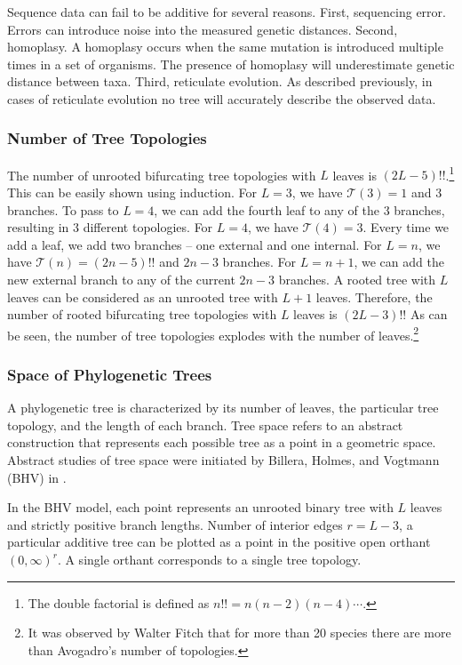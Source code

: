 Sequence data can fail to be additive for several reasons.
First, sequencing error.
Errors can introduce noise into the measured genetic distances.
Second, homoplasy.
A homoplasy occurs when the same mutation is introduced multiple times in a set of organisms.
The presence of homoplasy will underestimate genetic distance between taxa.
Third, reticulate evolution.
As described previously, in cases of reticulate evolution no tree will accurately describe the observed data.

\subsubsection{Number of Tree Topologies}

The number of unrooted bifurcating tree topologies with $L$ leaves is $(2L-5)!!$.\footnote{The double factorial is defined as $n!!=n(n-2)(n-4)\cdots$.}
This can be easily shown using induction.
For $L=3$, we have $\mathcal{T}(3)=1$ and $3$ branches.
To pass to $L=4$, we can add the fourth leaf to any of the $3$ branches, resulting in $3$ different topologies.
For $L=4$, we have $\mathcal{T}(4)=3$.
Every time we add a leaf, we add two branches -- one external and one internal.
For $L=n$, we have $\mathcal{T}(n)=(2n-5)!!$ and $2n-3$ branches.
For $L=n+1$, we can add the new external branch to any of the current $2n-3$ branches.
A rooted tree with $L$ leaves can be considered as an unrooted tree with $L+1$ leaves.
Therefore, the number of rooted bifurcating tree topologies with $L$ leaves is $(2L-3)!!$
As can be seen, the number of tree topologies explodes with the number of leaves.\footnote{It was observed by Walter Fitch that for more than 20 species there are more than Avogadro's number of topologies.}

\subsubsection{Space of Phylogenetic Trees }

A phylogenetic tree is characterized by its number of leaves, the particular tree topology, and the length of each branch.
Tree space refers to an abstract construction that represents each possible tree as a point in a geometric space.
Abstract studies of tree space were initiated by Billera, Holmes, and Vogtmann (BHV) in \cite{Billera:2001tv}.

In the BHV model, each point represents an unrooted binary tree with $L$ leaves and strictly positive branch lengths.
Number of interior edges $r=L-3$, a particular additive tree can be plotted as a point in the positive open orthant $(0,\infty)^{r}$.
A single orthant corresponds to a single tree topology.

